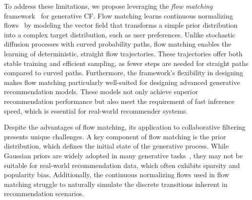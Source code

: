 \documentclass[sigconf]{acmart}
\begin{document}
To address these limitations, we propose leveraging the \textit{flow matching} framework~\cite{lipman2022flow} for generative CF. Flow matching learns continuous normalizing flows~\cite{chen2018neural} by modeling the vector field that transforms a simple prior distribution into a complex target distribution, such as user preferences. Unlike stochastic diffusion processes with curved probability paths, flow matching enables the learning of deterministic, straight flow trajectories. These trajectories offer both stable training and efficient sampling, as fewer steps are needed for straight paths compared to curved paths. Furthermore, the framework's flexibility in designing makes flow matching particularly well-suited for designing advanced generative recommendation models. These models not only achieve superior recommendation performance but also meet the requirement of fast inference speed, which is essential for real-world recommender systems.

Despite the advantages of flow matching, its application to collaborative filtering presents unique challenges. A key component of flow matching is the prior distribution, which defines the initial state of the generative process. While Gaussian priors are widely adopted in many generative tasks~\cite{liu2022flow, albergo2022building}, they may not be suitable for real-world recommendation data, which often exhibits sparsity and popularity bias. 
Additionally, the continuous normalizing flows used in flow matching struggle to naturally simulate the discrete transitions inherent in recommendation scenarios. 
\end{document}
